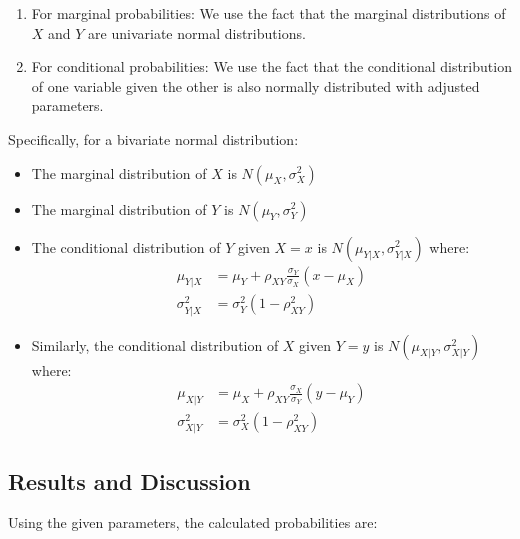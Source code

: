\documentclass[12pt]{article}
\begin{document}
\begin{enumerate}
    \item For marginal probabilities: We use the fact that the marginal distributions of $X$ and $Y$ are univariate normal distributions.
    \item For conditional probabilities: We use the fact that the conditional distribution of one variable given the other is also normally distributed with adjusted parameters.
\end{enumerate}

Specifically, for a bivariate normal distribution:
\begin{itemize}
    \item The marginal distribution of $X$ is $N(\mu_X, \sigma_X^2)$
    \item The marginal distribution of $Y$ is $N(\mu_Y, \sigma_Y^2)$
    \item The conditional distribution of $Y$ given $X=x$ is $N(\mu_{Y|X}, \sigma_{Y|X}^2)$ where:
    \begin{align*}
        \mu_{Y|X} &= \mu_Y + \rho_{XY}\frac{\sigma_Y}{\sigma_X}(x - \mu_X) \\
        \sigma_{Y|X}^2 &= \sigma_Y^2(1 - \rho_{XY}^2)
    \end{align*}
    \item Similarly, the conditional distribution of $X$ given $Y=y$ is $N(\mu_{X|Y}, \sigma_{X|Y}^2)$ where:
    \begin{align*}
        \mu_{X|Y} &= \mu_X + \rho_{XY}\frac{\sigma_X}{\sigma_Y}(y - \mu_Y) \\
        \sigma_{X|Y}^2 &= \sigma_X^2(1 - \rho_{XY}^2)
    \end{align*}
\end{itemize}

\subsection{Results and Discussion}

Using the given parameters, the calculated probabilities are:
\end{document}
